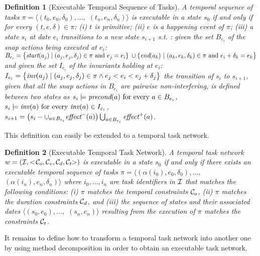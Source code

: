 \documentclass[letterpaper]{article} %
\newtheorem{definition}{Definition}
\newcommand{\name}{\text{\it name}}
\newcommand{\pre}{\text{\it precond}}
\newcommand{\add}{\text{\it effect}^{+}}
\newcommand{\del}{\text{\it effect}^{-}}
\newcommand{\tstart}{\text{\it start}}
\newcommand{\tend}{\text{\it end}}
\newcommand{\tinv}{\text{\it inv}}
\newcommand{\task}{\text{\it task}}
\newcommand{\tn}{\text{\it tn}}
\begin{document}
\begin{definition}[Executable Temporal Sequence of Tasks]
  A temporal sequence of tasks $\pi = \langle (t_0, e_0, \delta_0), \ldots,$ $(t_n, e_n, \delta_n) \rangle$ is executable in a state $s_0$ if and only if for every $(t, e, \delta) \in \pi$:
  (i) $t$ is primitive;
  (ii) $e$ is a happening event of $\pi$;
  (iii) %
  a state $s_i$ at date $e_i$ transitions to a new state $s_{i+1}$ s.t. : given the set  $B_{e_i}$ of the snap actions being executed at $e_i$: $B_{e_i} = \bigl\{ \tstart(a_j) \; | \;  (a_j, e_j, \delta_j) \in \pi \text{ and } e_j = e_i \} \; \cup  \{\tend(a_k) \ | \ (a_k, e_k, \delta_k) \in \pi \text{ and } e_i + \delta_k = e_k\bigr\}$ and given the set $I_{e_i}$ of the invariants holding at $e_i$:
$I_{e_i} = \bigl\{ \tinv(a_j) \; | \; (a_j, e_j, \delta_j) \in \pi \wedge e_j < e_i < e_j + \delta_j\bigr\}$     the transition of $s_i$ to  $s_{i+1}$, given that all the snap actions in $B_{e_i}$ are \emph{pairwise non-interfering}, is defined between two states as $s_i \models \pre(a) \text{ for every } a \in B_{e_i}$, $s_i \models \tinv(a) \text{ for every }\tinv(a) \in I_{e_i}$, $s_{i+1} = \left(s_i - \cup_{a \in B_{e_i}} \del(a)\right) \bigcup_{a \in B_{e_i}} \add(a)$.       
\end{definition}


 This definition can easily be extended to a temporal task network.

  \begin{definition}[Executable Temporal Task Network] A temporal task network $w = ({\cal{I}}, <\!{\cal{C}}_o, {\cal{C}}_v, {\cal{C}}_d, {\cal{C}}_t\!\!>)$ is executable in a state $s_0$ if and only if there exists an executable temporal sequence of tasks $\pi = \langle (\alpha(i_0), e_0, \delta_0), \ldots,$ $(\alpha(i_n), e_n, \delta_n)\rangle$  where $i_0, \ldots, i_n$ are task identifiers in $\cal{I}$ that matches the following conditions: (i) $\pi$ matches the temporal constraints ${\cal{C}}_o$, (ii) $\pi$ matches the duration constraints ${\cal{C}}_d$, and (iii) the sequence of states and their associated dates $\langle (s_0, e_0), \ldots,$ $(s_n, e_n) \rangle$ resulting from the execution of $\pi$ matches the constraints ${\cal{C}}_t$.
  \end{definition}

  It remains to define how to transform a temporal task network into another one by using method decomposition in order to obtain an executable task network.
%
\end{document}
